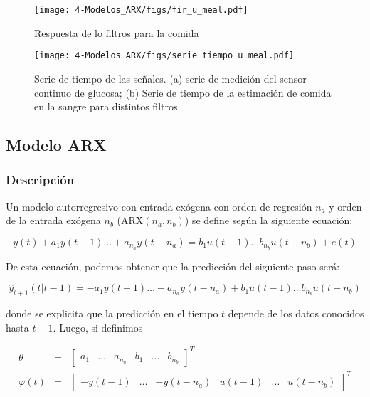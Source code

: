\begin{description}
\begin{figure}[H]
	\centering
	\texttt{[image: 4-Modelos\_ARX/figs/fir\_u\_meal.pdf]}
	\caption{Respuesta de lo filtros para la comida}
	\label{fig:fir_u_meal}
\end{figure}

\begin{figure}[H]
	\centering
	\texttt{[image: 4-Modelos\_ARX/figs/serie\_tiempo\_u\_meal.pdf]}
	\caption{Serie de tiempo de las señales. (a) serie de medición del sensor continuo de glucosa; (b) Serie de tiempo de la estimación de comida en la sangre para distintos filtros}
	\label{fig:serie_tiempo_u_meal}
\end{figure}




\end{description}

\subsection{Modelo ARX}

\subsubsection*{Descripción}

Un modelo autorregresivo con entrada exógena con orden de regresión $n_a$ y orden de la entrada exógena $n_b$ (ARX$(n_a,n_b)$) se define según la siguiente ecuación:

\begin{equation}
	y(t) + a_1 y(t-1) \dots + a_{n_a} y(t-n_a) = b_1 u(t-1) \dots b_{n_b} u(t-n_b) + e(t)
\end{equation}

De esta ecuación, podemos obtener que la predicción del siguiente paso será:

\begin{equation}
	\hat{y}_{t+1}(t| t - 1) =  - a_1 y(t-1) \dots - a_{n_a} y(t-n_a) + b_1 u(t-1) \dots b_{n_b} u(t-n_b) 
\end{equation}

donde se explicita que la predicción en el tiempo $t$ depende de los datos conocidos hasta $t - 1$. Luego, si definimos

\begin{eqnarray}
	\theta  & = & 
	\begin{bmatrix}
	a_1 & \dots & a_{n_a} & b_1 & \dots & b_{n_b}
	\end{bmatrix}^T\\
	\varphi(t) & = &
	\begin{bmatrix}
	-y(t-1) & \dots & -y(t-n_a) & u(t-1) & \dots & u(t-n_b)
	\end{bmatrix}^T
\end{eqnarray}

